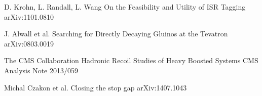 \begin{thebibliography}{2}

             {D. Krohn, L. Randall, L. Wang}
             {On the Feasibility and Utility of ISR Tagging}
             {arXiv:1101.0810}

             {J. Alwall et al.}
             {Searching for Directly Decaying Gluinos at the Tevatron}
             {arXiv:0803.0019}

             {The CMS Collaboration}
             {Hadronic Recoil Studies of Heavy Boosted Systems}
             {CMS Analysis Note 2013/059}


             {Michal Czakon et al.}
             {Closing the stop gap}
             {arXiv:1407.1043}

\end{thebibliography}



